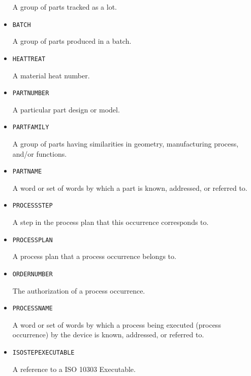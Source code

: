 \begin{itemize}
A group of parts tracked as a lot.


\item \texttt{BATCH}  

A group of parts produced in a batch.


\item \texttt{HEAT\textunderscore TREAT}  

A material heat number.


\item \texttt{PART\textunderscore NUMBER}  

A particular part design or model.


\item \texttt{PART\textunderscore FAMILY}  

A group of parts having similarities in geometry, manufacturing process, and/or functions.


\item \texttt{PART\textunderscore NAME}  

A word or set of words by which a part is known, addressed, or referred to.


\item \texttt{PROCESS\textunderscore STEP}  

A step in the process plan that this occurrence corresponds to. 


\item \texttt{PROCESS\textunderscore PLAN}  

A process plan that a process occurrence belongs to.


\item \texttt{ORDER\textunderscore NUMBER}  

The authorization of a process occurrence.


\item \texttt{PROCESS\textunderscore NAME}  

A word or set of words by which a process being executed (process occurrence) by the device is known, addressed, or referred to.



\item \texttt{ISO\textunderscore STEP\textunderscore EXECUTABLE}  

A reference to a ISO 10303 Executable.

\end{itemize}


